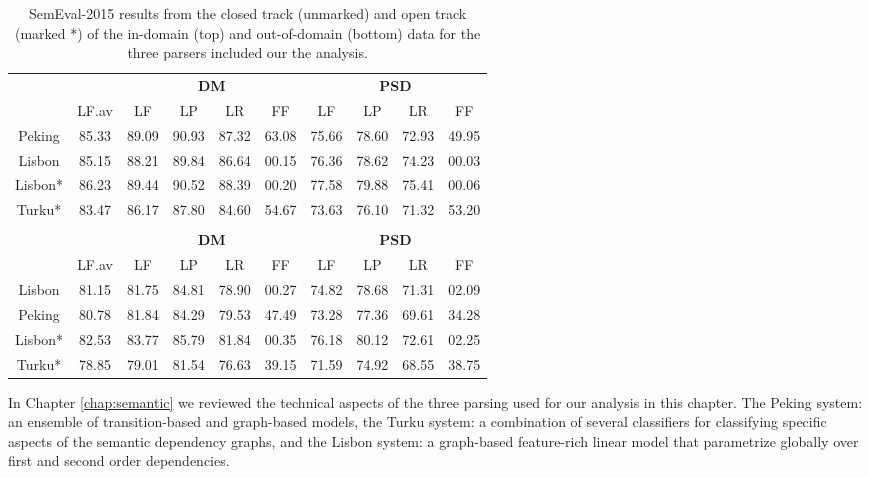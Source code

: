 \begin{table}
    \centering
    \begin{tabular}{@{}cccccccccc@{}}
        \toprule
        \multicolumn{1}{c}{ }
        & \multicolumn{1}{c}{ }
        & \multicolumn{4}{c}{\textbf{DM}}
        & \multicolumn{4}{c}{\textbf{PSD}} \\
        \cmidrule(lr){3-6}
        \cmidrule(lr){7-10}
        &
        LF.av &
        LF & LP & LR & FF &
        LF & LP & LR & FF \\
        \midrule
        Peking & 85.33 & 89.09 & 90.93 & 87.32 & 63.08 & 75.66 & 78.60 & 72.93 & 49.95 \\
        Lisbon & 85.15 & 88.21 & 89.84 & 86.64 & 00.15 & 76.36 & 78.62 & 74.23 & 00.03 \\
        \midrule
        Lisbon* & 86.23 & 89.44 & 90.52 & 88.39 & 00.20 & 77.58 & 79.88 & 75.41 & 00.06 \\
        Turku* & 83.47 & 86.17 & 87.80 & 84.60 & 54.67 & 73.63 & 76.10 & 71.32 & 53.20 \\
        \bottomrule
        
        \\
        \toprule
        \multicolumn{1}{c}{ }
        & \multicolumn{1}{c}{ }
        & \multicolumn{4}{c}{\textbf{DM}}
        & \multicolumn{4}{c}{\textbf{PSD}} \\
        \cmidrule(lr){3-6}
        \cmidrule(lr){7-10}
        &
        LF.av &
        LF & LP & LR & FF &
        LF & LP & LR & FF \\
        \midrule
        Lisbon & 81.15 & 81.75 & 84.81 & 78.90 & 00.27 & 74.82 & 78.68 & 71.31 & 02.09 \\
        Peking & 80.78 & 81.84 & 84.29 & 79.53 & 47.49 & 73.28 & 77.36 & 69.61 & 34.28 \\
        \midrule
        Lisbon* & 82.53 & 83.77 & 85.79 & 81.84 & 00.35 & 76.18 & 80.12 & 72.61 & 02.25 \\
        Turku* & 78.85 & 79.01 & 81.54 & 76.63 & 39.15 & 71.59 & 74.92 & 68.55 & 38.75 \\
        \bottomrule
    \end{tabular}
    \caption{SemEval-2015 results from the closed track (unmarked) and open track (marked *) of the in-domain (top) and out-of-domain (bottom) data for the three parsers included our the analysis.}
    \label{fig:data:recap}
\end{table}

In Chapter \ref{chap:semantic} we reviewed the technical aspects of the three parsing used for our analysis in this chapter. The Peking system: an ensemble of transition-based and graph-based models, the Turku system: a combination of several classifiers for classifying specific aspects of the semantic dependency graphs, and the Lisbon system: a graph-based feature-rich linear model that parametrize globally over first and second order dependencies.

